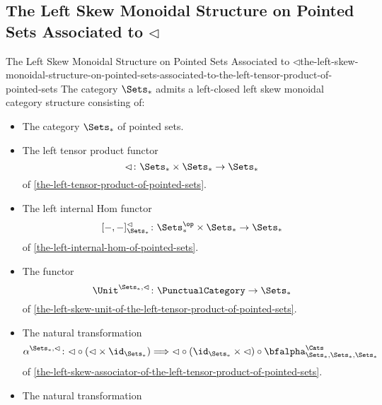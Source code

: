 \subsection{The Left Skew Monoidal Structure on Pointed Sets Associated to $\lhd$}\label{subsection-the-left-skew-monoidal-structure-on-pointed-sets-associated-to-the-left-tensor-product-of-pointed-sets}
\begin{proposition}{The Left Skew Monoidal Structure on Pointed Sets Associated to $\lhd$}{the-left-skew-monoidal-structure-on-pointed-sets-associated-to-the-left-tensor-product-of-pointed-sets}%
    The category $\Sets_{*}$ admits a left-closed left skew monoidal category structure consisting of:%
    \begin{itemize}
        \item{}The category $\Sets_{*}$ of pointed sets.
        \item{}The left tensor product functor
            \[
                \lhd%
                \colon%
                \Sets_{*}\times\Sets_{*}%
                \to%
                \Sets_{*}
            \]%
            of \cref{the-left-tensor-product-of-pointed-sets}.
        \item{}The left internal Hom functor
            \[
                [-,-]^{\lhd}_{\Sets_{*}}%
                \colon%
                \Sets^{\op}_{*}\times\Sets_{*}%
                \to%
                \Sets_{*}%
            \]%
            of \cref{the-left-internal-hom-of-pointed-sets}.
        \item{}The functor
            \[
                \Unit^{\Sets_{*},\lhd}
                \colon
                \PunctualCategory
                \to
                \Sets_{*}
            \]
            of \cref{the-left-skew-unit-of-the-left-tensor-product-of-pointed-sets}.
        \item{}The natural transformation
            \[
                \alpha^{\Sets_{*},\lhd}%
                \colon%
                {\lhd}\circ{({\lhd}\times\id_{\Sets_{*}})}%
                \Longrightarrow%
                {\lhd}\circ{(\id_{\Sets_{*}}\times{\lhd})}\circ{\bfalpha^{\Cats}_{\Sets_{*},\Sets_{*},\Sets_{*}}}%
            \]
            of \cref{the-left-skew-associator-of-the-left-tensor-product-of-pointed-sets}.
        \item{}The natural transformation

\end{itemize}
\end{proposition}

